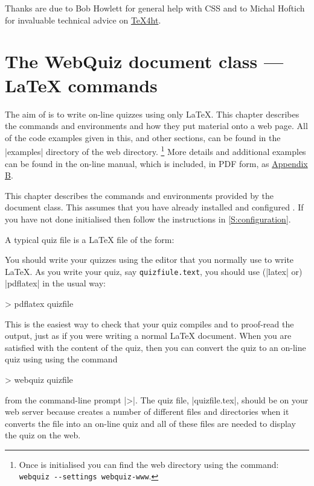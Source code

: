 \documentclass[svgnames]{article}
\newcommand\TeXfht{\href{https://www.ctan.org/tex4ht}{TeX4ht}\xspace}
\begin{document}
   Thanks are due to Bob Howlett for general help with CSS and to
   Michal Hoftich for invaluable technical advice on \TeXfht.

 \section{The WebQuiz document class --- \LaTeX{} commands}
 \label{S:documentclass}

  The aim of \WebQuiz is to write on-line quizzes using only \LaTeX.
  This chapter describes the \WebQuiz commands and environments and how
  they put material onto a web page.  All of the code examples given in
  this, and other sections, can be found in the \BashCode|examples|
  directory of the \WebQuiz web directory.%
  \footnote{Once \WebQuiz is initialised you can find the \WebQuiz web
  directory using the command:\newline
  \hspace*{10mm}\lstinline[style=bashcode]|webquiz --settings webquiz-www|.}
  More details and additional examples can be found in the on-line manual,
  which is included, in PDF form, as \hyperref[S:online]{Appendix B}.

  This chapter describes the commands and environments provided by the
  \WebQuiz document class. This assumes that you have already installed
  and configured \WebQuiz. If you have not done initialised \WebQuiz
  then follow the instructions in \autoref{S:configuration}.

  A typical \WebQuiz quiz file is a \LaTeX{} file of the form:


  \noindent You should write your quizzes using the editor that you
  normally use to write \LaTeX. As you write your quiz, say
  \texttt{quizfiule.text}, you should use (\BashCode|latex| or)
  \BashCode|pdflatex| in the usual way:
  \begin{bashcode}
      > pdflatex quizfile
  \end{bashcode}
  This is the easiest way to check that your quiz compiles and to
  proof-read the output, just as if you were writing a normal
  \LaTeX{} document. When you are satisfied with the content of the
  quiz, then you can convert the quiz to an on-line quiz using \WebQuiz
  using the command
  \begin{bashcode}
     > webquiz quizfile
  \end{bashcode}
  from the command-line prompt \BashCode|>|. The quiz file,
  \BashCode|quizfile.tex|, should be on your web server because \WebQuiz
  creates a number of different files and directories when it converts
  the file into an on-line quiz and all of these files are needed to
  display the quiz on the web.
\end{document}
